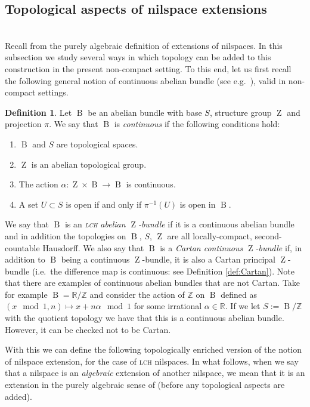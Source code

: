 \documentclass[a4paper,12pt,reqno]{amsart}
\theoremstyle{definition}
\newtheorem{defn}[theorem]{Definition}
\def\to{\rightarrow}
\newcommand{\mb}{\mathbb}
\DeclareMathOperator{\ab}{Z}
\DeclareMathOperator{\bnd}{B}
\begin{document}
\subsection{Topological aspects of nilspace extensions}\label{subsec:topaspextLCH}\hfill\\
Recall from \cite[\S 3.3.3]{Cand:Notes1} the purely algebraic definition of extensions of nilspaces. In this subsection we study several ways in which topology can be added to this construction in the present non-compact setting. To this end, let us first recall the following general notion of continuous abelian bundle (see e.g.\ \cite[Definition 2.1.6]{Cand:Notes2}), valid in non-compact settings.
\begin{defn}\label{def:CtsAbBund}
Let $\bnd$ be an abelian bundle with base $S$, structure group $\ab$ and projection $\pi$. We say that $\bnd$ is  \emph{continuous} if the following conditions hold:
\begin{enumerate}
\item $\bnd$ and $S$ are topological spaces.
\item $\ab$ is an abelian topological group.
\item The action $\alpha:\ab\times \bnd\to \bnd$ is continuous.
\item A set $U\subset S$ is open if and only if $\pi^{-1}(U)$ is open in $\bnd$.
\end{enumerate}
\end{defn}
\noindent We say that $\bnd$ is an \emph{\textsc{lch} abelian $\ab$-bundle} if it is a continuous abelian bundle and in addition the topologies on $\bnd$, $S$, $\ab$ are all locally-compact, second-countable Hausdorff. We also say that $\bnd$ is a \emph{Cartan continuous $\ab$-bundle} if, in addition to $\bnd$ being a continuous $\ab$-bundle, it is also a Cartan principal $\ab$-bundle (i.e.\ the difference map is continuous: see Definition \ref{def:Cartan}). Note that there are examples of continuous abelian bundles that are not Cartan. Take for example $\bnd=\mb{R}/\mb{Z}$ and consider the action of $\mb{Z}$ on $\bnd$ defined as $(x\mod 1,n)\mapsto x+n\alpha \mod 1$ for some irrational $\alpha\in\mb{R}$. If we let $S:=\bnd/\mb{Z}$ with the quotient topology we have that this is a continuous abelian bundle. However, it can be checked not to be Cartan.




With this we can define the following topologically enriched version of the notion of nilspace extension, for the case of \textsc{lch} nilspaces. In what follows, when we say that a nilspace is an \emph{algebraic} extension of another nilspace, we mean that it is an extension in the purely algebraic sense of \cite[\S 3.3.3]{Cand:Notes1} (before any topological aspects are added).
\end{document}
